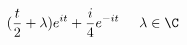 \begin{displaymath}
 (\frac{t}{2}+\lambda)e^{it} + \frac{i}{4}e^{-it}\hspace{0.5cm} \lambda \in \C
\end{displaymath}

